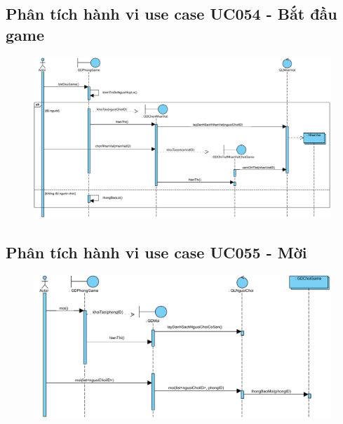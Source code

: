 \documentclass[3p]{elsarticle}
\begin{document}
\subsection{Phân tích hành vi use case UC054 - Bắt đầu game}
\begin{figure}[!htbp]
	\hspace*{-.5in}
	\centering
	\includegraphics[scale=.5]{images/sequence-pdfs/gamer/PlayGame_Start.pdf}
\end{figure}

\subsection{Phân tích hành vi use case UC055 - Mời}
\begin{figure}[!htbp]
	\hspace*{-.5in}
	\centering
	\includegraphics[scale=.55]{images/sequence-pdfs/gamer/PlayGame_Invite.pdf}
\end{figure}
\newpage
\end{document}
